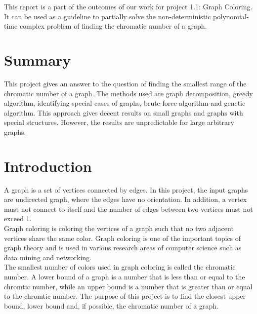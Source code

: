 \documentclass[a4paper]{report}
\begin{document}
	This report is a part of the outcomes of our work for project 1.1: Graph Coloring. It can be used as a guideline to partially solve the non-deterministic polynomial-time complex problem of finding the chromatic number of a graph.
	  
	
	\chapter*{Summary}
	This project gives an answer to the question of finding the smallest range of the chromatic number of a graph. The methods used are graph decomposition, greedy algorithm, identifying special cases of graphs, brute-force algorithm and genetic algorithm. This approach gives decent results on small graphs and graphs with special structures. However, the results are unpredictable for large arbitrary graphs.
	
	\tableofcontents
	

	
	\chapter{Introduction}
	
	A graph is a set of vertices connected by edges. In this project, the input graphs are undirected graph, where the edges have no orientation. In addition, a vertex must not connect to itself and the number of edges between two vertices must not exceed 1. \\
	
	Graph coloring is coloring the vertices of a graph such that no two adjacent vertices share the same color. Graph coloring is one of the important topics of graph theory and is used in various research areas of computer science such as data mining and networking.\\
	
	The smallest number of colors used in graph coloring is called the chromatic number. A lower bound of a graph is a number that is less than or equal to the chromtic number, while an upper bound is a number that is greater than or equal to the chromtic number. The purpose of this project is to find the closest upper bound, lower bound and, if possible, the chromatic number of a graph.\\
	
\end{document}
